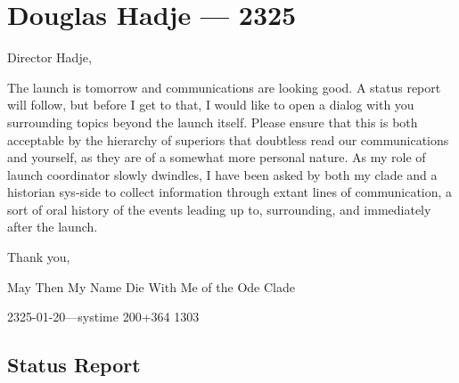 \hypertarget{douglas-hadje-2325}{%
\chapter{Douglas Hadje — 2325}\label{douglas-hadje-2325}}

Director Hadje,

The launch is tomorrow and communications are looking good. A status report will follow, but before I get to that, I would like to open a dialog with you surrounding topics beyond the launch itself. Please ensure that this is both acceptable by the hierarchy of superiors that doubtless read our communications and yourself, as they are of a somewhat more personal nature. As my role of launch coordinator slowly dwindles, I have been asked by both my clade and a historian sys-side to collect information through extant lines of communication, a sort of oral history of the events leading up to, surrounding, and immediately after the launch.

Thank you,

May Then My Name Die With Me of the Ode Clade

2325-01-20---systime 200+364 1303

\hypertarget{status-report}{%
\section{Status Report}\label{status-report}}

